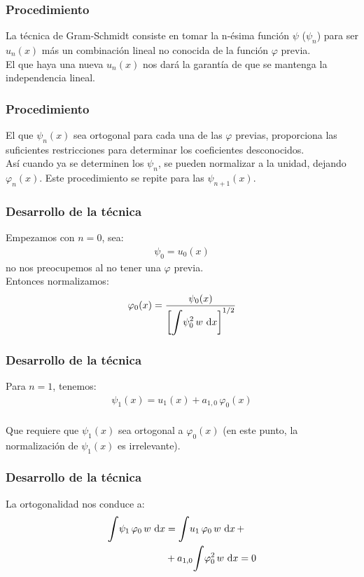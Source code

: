 \documentclass[12pt]{beamer}
\begin{document}
\begin{frame}
\frametitle{Procedimiento}
La técnica de Gram-Schmidt consiste en tomar la n-ésima función $\psi$ ($\psi_{n}$) para ser $u_{n}(x)$ más un combinación lineal no conocida de la función $\varphi$ previa.
\\
\bigskip
\pause
El que haya una nueva $u_{n}(x)$ nos dará la garantía de que se mantenga la independencia lineal.
\end{frame}
\begin{frame}
\frametitle{Procedimiento}
El que $\psi_{n}(x)$ sea ortogonal para cada una de las $\varphi$ previas, proporciona las suficientes restricciones para determinar los coeficientes desconocidos.
\\
\bigskip
\pause
Así cuando ya se determinen los $\psi_{n}$, se pueden normalizar a la unidad, dejando $\varphi_{n}(x)$. Este procedimiento se repite para las $\psi_{n+1}(x)$.
\end{frame}
\begin{frame}
\frametitle{Desarrollo de la técnica}
Empezamos con $n = 0$, sea:
\pause
\begin{align}
\psi_{0} = u_{0}(x)
\label{eq:ecuacion_10_41}
\end{align}
no nos preocupemos al no tener una $\varphi$ previa.
\\
\bigskip
\pause
Entonces normalizamos:
\pause
\begin{align}
\varphi_{0}(x) = \dfrac{\psi_{0}(x)}{\left[ \displaystyle \scaleint{6ex} \psi_{0}^{2} \, w \, \dd{x} \right]^{1/2}}
\label{eq:ecuacion_10_42}
\end{align}
\end{frame}
\begin{frame}
\frametitle{Desarrollo de la técnica}
Para $n = 1$, tenemos:
\pause
\begin{align}
\psi_{1}(x) = u_{1}(x) + a_{1,0} \, \varphi_{0}(x)
\label{eq:ecuacion_10_43}
\end{align}
\\
\bigskip
\pause
Que requiere que $\psi_{1}(x)$ sea ortogonal a $\varphi_{0}(x)$ (en este punto, la normalización de $\psi_{1}(x)$ es irrelevante).
\end{frame}
\begin{frame}
\frametitle{Desarrollo de la técnica}
La ortogonalidad nos conduce a:
\pause
\begin{align}
\begin{aligned}[b]
\scaleint{6ex} \psi_{1} \, \varphi_{0} \, w \, \dd{x} &= \scaleint{6ex} u_{1} \, \varphi_{0} \, w \, \dd{x} + \\
&+ a_{1,0} \scaleint{6ex} \varphi_{0}^{2} \, w \,  \dd{x} = 0
\end{aligned}
\label{eq:ecuacion_10_44}
\end{align}
\end{frame}
\end{document}
